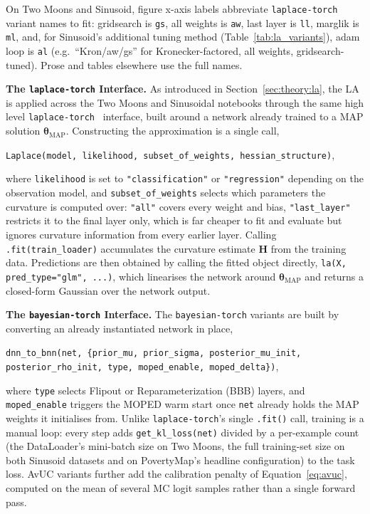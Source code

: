 \documentclass[conference]{IEEEtran}
\newcommand{\btheta}{\bm{\theta}}
\newcommand{\MAP}{\text{MAP}}
\begin{document}
On Two Moons and Sinusoid, figure x-axis labels abbreviate \texttt{laplace-torch} variant
names to fit: gridsearch is \texttt{gs}, all weights is \texttt{aw}, last layer is
\texttt{ll}, marglik is \texttt{ml}, and, for Sinusoid's additional tuning method
(Table~\ref{tab:la_variants}), adam loop is \texttt{al} (e.g.\ ``Kron/aw/gs'' for
Kronecker-factored, all weights, gridsearch-tuned). Prose and tables elsewhere use the full
names.

\textbf{The \texttt{laplace-torch} Interface.} \label{sec:imp:la_api}As introduced in
Section~\ref{sec:theory:la}, the LA is applied across the Two Moons and Sinusoidal notebooks
through the same high level
\texttt{laplace-torch}~\citep{daxberger2021laplace} interface, built
around a network already trained to a MAP solution $\btheta_{\MAP}$. Constructing the
approximation is a single call,
\begin{center}
\texttt{Laplace(model, likelihood, subset\_of\_weights, hessian\_structure)},
\end{center}
where \texttt{likelihood} is set to \texttt{"classification"} or \texttt{"regression"}
depending on the observation model, and \texttt{subset\_of\_weights} selects which
parameters the curvature is computed over: \texttt{"all"} covers every weight and bias,
\texttt{"last\_layer"} restricts it to the final layer only, which is far cheaper to fit and
evaluate but ignores curvature information from every earlier layer. Calling
\texttt{.fit(train\_loader)} accumulates the curvature estimate $\mathbf{H}$ from the
training data. Predictions are then obtained by calling the fitted object directly,
\texttt{la(X, pred\_type="glm", ...)}, which linearises the network around $\btheta_{\MAP}$
and returns a closed-form Gaussian over the network output.

\textbf{The \texttt{bayesian-torch} Interface.}
\label{sec:imp:bt_api}
The \texttt{bayesian-torch} variants are built by converting
an already instantiated network in place,
\begin{center}
\texttt{dnn\_to\_bnn(net, \{prior\_mu, prior\_sigma, posterior\_mu\_init, posterior\_rho\_init, type, moped\_enable, moped\_delta\})},
\end{center}
where \texttt{type} selects Flipout or Reparameterization (BBB) layers, and
\texttt{moped\_enable} triggers the MOPED warm start once \texttt{net} already holds the MAP
weights it initialises from. Unlike \texttt{laplace-torch}'s single \texttt{.fit()} call,
training is a manual loop: every step adds \texttt{get\_kl\_loss(net)} divided by a
per-example count (the DataLoader's mini-batch size on Two Moons, the full training-set size
on both Sinusoid datasets and on PovertyMap's headline configuration) to the task loss.
AvUC variants further add the calibration
penalty of Equation~\eqref{eq:avuc}, computed on the mean of several MC logit samples rather
than a single forward pass.
\end{document}
